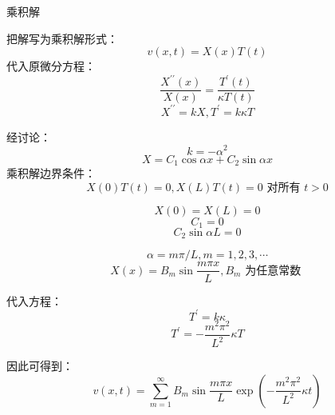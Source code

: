 \documentclass[10pt]{beamer}
\begin{document}
\begin{frame}[allowframebreaks]{乘积解}

把解写为乘积解形式：
\begin{equation}
v(x, t)=X(x) T(t)
\end{equation}
代入原微分方程：
\begin{equation}
\frac{X^{\prime \prime}(x)}{X(x)}=\frac{T^{\prime}(t)}{\kappa T(t)}
\end{equation}
\begin{equation}
X^{\prime \prime}=k X, T^{\prime}=k \kappa T
\end{equation}


经讨论：\begin{equation}k=-\alpha^2\end{equation}
\begin{equation}
X=C_{1} \cos \alpha x+C_{2} \sin \alpha x
\end{equation}
乘积解边界条件：
\begin{equation}
X(0) T(t)=0, X(L) T(t)=0 \text { 对所有 } t>0
\end{equation} 

\begin{equation}
X(0)=X(L)=0
\end{equation}
\begin{equation}
C_{1}=0
\end{equation}
\begin{equation}
C_{2} \sin \alpha L=0
\end{equation}

\begin{equation}
\alpha=m \pi / L, m=1,2,3, \cdots
\end{equation}
\begin{equation}
X(x)=B_{m} \sin \frac{m \pi x}{L}, B_{m} \text { 为任意常数 }
\end{equation}

代入方程：\begin{equation}T^{\prime}=k \kappa \end{equation}
\begin{equation}
T^{\prime}=-\frac{m^{2} \pi^{2}}{L^{2}} \kappa T
\end{equation}

因此可得到：
\begin{equation}
v(x, t)=\sum_{m=1}^{\infty} B_{m} \sin \frac{m \pi x}{L} \exp \left(-\frac{m^{2} \pi^{2}}{L^{2}} \kappa t\right)
\end{equation}


\end{frame}
\end{document}
